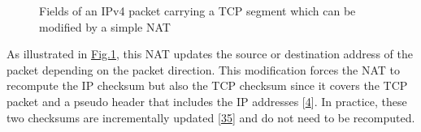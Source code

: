 \documentclass[letterpaper,10pt,english]{sphinxmanual}
\begin{document}
\begin{figure}[htbp]\centering\capstart{}\caption{Fields of an IPv4 packet carrying a TCP segment which can be modified by a simple NAT}\label{\detokenize{mptcp:id79}}\label{\detokenize{mptcp:fig-mptcp-ip4tcp-nat}}\end{figure}
\sphinxAtStartPar
As illustrated in \hyperref[\detokenize{mptcp:fig-mptcp-ip4tcp-nat}]{Fig.\@ \ref{\detokenize{mptcp:fig-mptcp-ip4tcp-nat}}}, this NAT updates the source or destination address of the packet depending on the packet direction. This modification forces the NAT to recompute the IP checksum but also the TCP checksum since it covers the TCP packet and a pseudo header that includes the IP addresses {[}\hyperlink{cite.biblio:id729}{4}{]}. In practice, these two checksums are incrementally updated {[}\hyperlink{cite.biblio:id2952}{35}{]} and do not need to be recomputed.
\end{document}

